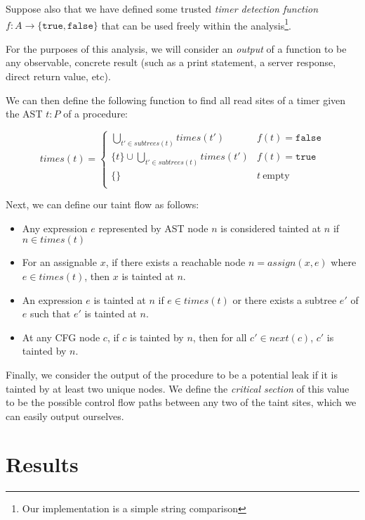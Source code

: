 \documentclass[12pt]{article}
\begin{document}
\begin{multicols*}{2}
  Suppose also that we have defined some trusted \textit{timer detection function}
  $f: A \rightarrow \{\texttt{true}, \texttt{false}\}$ that can be used freely
  within the analysis\footnote{Our implementation is a simple string
  comparison}.

  For the purposes of this analysis, we will consider an \textit{output} of a
  function to be any observable, concrete result (such as a print statement,
  a server response, direct return value, etc).

  We can then define the following function to find all read sites of a timer
  given the AST $t:P$ of a procedure:

  \begin{equation*}
    times(t) = \begin{cases}
      \bigcup\limits_{t' \in subtrees(t)}times(t') &
        f(t) = \texttt{false} \\
      \{t\} \cup \bigcup\limits_{t' \in subtrees(t)}times(t') &
        f(t) = \texttt{true} \\
      \{ \} & t\ \text{empty} \\
    \end{cases}
  \end{equation*}

  Next, we can define our taint flow as follows:

  \begin{itemize}
    \item Any expression $e$ represented by AST node $n$ is considered tainted
      at $n$ if $n \in times(t)$
    \item For an assignable $x$, if there exists a reachable node
      $n = assign(x,e)$ where $e \in times(t)$, then $x$ is tainted at $n$.
    \item An expression $e$ is tainted at $n$ if $e \in times(t)$ or there
      exists a subtree $e'$ of $e$ such that $e'$ is tainted at $n$.
    \item At any CFG node $c$, if $c$ is tainted by $n$, then for all
      $c' \in next(c)$, $c'$ is tainted by $n$.
  \end{itemize}

  Finally, we consider the output of the procedure to be a potential leak if
  it is tainted by at least two unique nodes. We define the
  \textit{critical section} of this value to be the possible control flow
  paths between any two of the taint sites, which we can easily output
  ourselves.

  \section{Results}


\end{multicols*}
\end{document}
